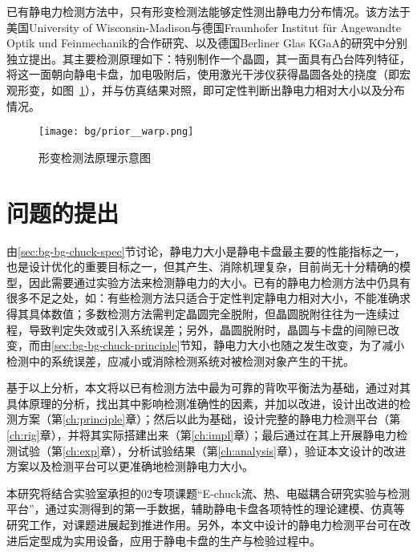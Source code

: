 已有静电力检测方法中，只有形变检测法能够定性测出静电力分布情况。该方法于美国University of Wisconsin-Madison与德国Fraunhofer Institut für Angewandte Optik und Feinmechanik的合作研究\cite{RefWorks:49}、以及德国Berliner Glas KGaA\cite{RefWorks:47}的研究中分别独立提出。其主要检测原理如下：特别制作一个晶圆，其一面具有凸台阵列特征，将这一面朝向静电卡盘，加电吸附后，使用激光干涉仪获得晶圆各处的挠度（即宏观形变，如图~\ref{fig:bg-prior-warp}），并与仿真结果对照，即可定性判断出静电力相对大小以及分布情况。

\begin{figure}[tbh]
\centering
\texttt{[image: bg/prior\_\_warp.png]}
\caption{形变检测法原理示意图}
\label{fig:bg-prior-warp}
\end{figure}



\section{问题的提出}\label{sec:bg-problem}

由\ref{sec:bg-bg-chuck-spec}节讨论，静电力大小是静电卡盘最主要的性能指标之一，也是设计优化的重要目标之一，但其产生、消除机理复杂，目前尚无十分精确的模型，因此需要通过实验方法来检测静电力的大小。已有的静电力检测方法中仍具有很多不足之处，如：有些检测方法只适合于定性判定静电力相对大小，不能准确求得其具体数值；多数检测方法需判定晶圆完全脱附，但晶圆脱附往往为一连续过程，导致判定失效或引入系统误差；另外，晶圆脱附时，晶圆与卡盘的间隙已改变，而由\ref{sec:bg-bg-chuck-principle}节知，静电力大小也随之发生改变，为了减小检测中的系统误差，应减小或消除检测系统对被检测对象产生的干扰。

基于以上分析，本文将以已有检测方法中最为可靠的背吹平衡法为基础，通过对其具体原理的分析，找出其中影响检测准确性的因素，并加以改进，设计出改进的检测方案（第\ref{ch:principle}章）；然后以此为基础，设计完整的静电力检测平台（第\ref{ch:rig}章），并将其实际搭建出来（第\ref{ch:impl}章）；最后通过在其上开展静电力检测试验（第\ref{ch:exp}章），分析试验结果（第\ref{ch:analysis}章），验证本文设计的改进方案以及检测平台可以更准确地检测静电力大小。

本研究将结合实验室承担的02专项课题“E-chuck流、热、电磁耦合研究实验与检测平台”，通过实测得到的第一手数据，辅助静电卡盘各项特性的理论建模、仿真等研究工作，对课题进展起到推进作用。另外，本文中设计的静电力检测平台可在改进后定型成为实用设备，应用于静电卡盘的生产与检验过程中。